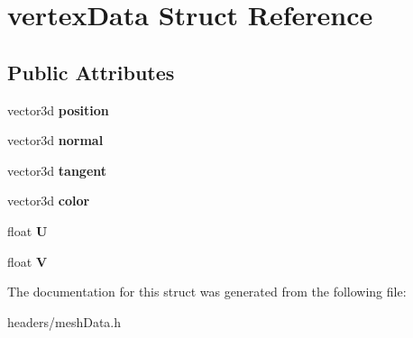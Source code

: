 \hypertarget{structvertex_data}{\section{vertex\+Data Struct Reference}
\label{structvertex_data}
}
\subsection*{Public Attributes}
\begin{DoxyCompactItemize}
\item 
\hypertarget{structvertex_data_a1f5339c29d91550540ccda2416f9c8ce}{vector3d {\bfseries position}}\label{structvertex_data_a1f5339c29d91550540ccda2416f9c8ce}

\item 
\hypertarget{structvertex_data_ae9ea26e1b387423c3f6020179090ca8a}{vector3d {\bfseries normal}}\label{structvertex_data_ae9ea26e1b387423c3f6020179090ca8a}

\item 
\hypertarget{structvertex_data_a98184d7dbaed6564b5318660e31ddf83}{vector3d {\bfseries tangent}}\label{structvertex_data_a98184d7dbaed6564b5318660e31ddf83}

\item 
\hypertarget{structvertex_data_a3d094b5d8d512292b2f632876a1087ac}{vector3d {\bfseries color}}\label{structvertex_data_a3d094b5d8d512292b2f632876a1087ac}

\item 
\hypertarget{structvertex_data_a591a12289db3cc813a19458b017958a0}{float {\bfseries U}}\label{structvertex_data_a591a12289db3cc813a19458b017958a0}

\item 
\hypertarget{structvertex_data_a23f31ed801acdb9c5c296249d1eda3dc}{float {\bfseries V}}\label{structvertex_data_a23f31ed801acdb9c5c296249d1eda3dc}

\end{DoxyCompactItemize}


The documentation for this struct was generated from the following file\+:\begin{DoxyCompactItemize}
\item 
headers/mesh\+Data.\+h\end{DoxyCompactItemize}
